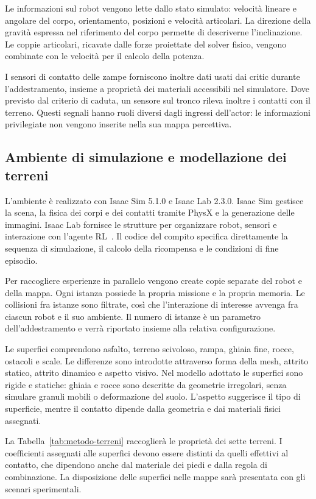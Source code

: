 Le informazioni sul robot vengono lette dallo stato simulato: velocità lineare e angolare del corpo, orientamento, posizioni e velocità articolari. La direzione della gravità espressa nel riferimento del corpo permette di descriverne l'inclinazione. Le coppie articolari, ricavate dalle forze proiettate del solver fisico, vengono combinate con le velocità per il calcolo della potenza.

I sensori di contatto delle zampe forniscono inoltre dati usati dai critic durante l'addestramento, insieme a proprietà dei materiali accessibili nel simulatore. Dove previsto dal criterio di caduta, un sensore sul tronco rileva inoltre i contatti con il terreno. Questi segnali hanno ruoli diversi dagli ingressi dell'actor: le informazioni privilegiate non vengono inserite nella sua mappa percettiva.

\subsection{Ambiente di simulazione e modellazione dei terreni}

L'ambiente è realizzato con Isaac Sim 5.1.0 e Isaac Lab 2.3.0. Isaac Sim gestisce la scena, la fisica dei corpi e dei contatti tramite PhysX e la generazione delle immagini. Isaac Lab fornisce le strutture per organizzare robot, sensori e interazione con l'agente RL~\citep{Mittal2025IsaacLab}. Il codice del compito specifica direttamente la sequenza di simulazione, il calcolo della ricompensa e le condizioni di fine episodio.

Per raccogliere esperienze in parallelo vengono create copie separate del robot e della mappa. Ogni istanza possiede la propria missione e la propria memoria. Le collisioni fra istanze sono filtrate, così che l'interazione di interesse avvenga fra ciascun robot e il suo ambiente. Il numero di istanze è un parametro dell'addestramento e verrà riportato insieme alla relativa configurazione.

Le superfici comprendono asfalto, terreno scivoloso, rampa, ghiaia fine, rocce, ostacoli e scale. Le differenze sono introdotte attraverso forma della mesh, attrito statico, attrito dinamico e aspetto visivo. Nel modello adottato le superfici sono rigide e statiche: ghiaia e rocce sono descritte da geometrie irregolari, senza simulare granuli mobili o deformazione del suolo. L'aspetto suggerisce il tipo di superficie, mentre il contatto dipende dalla geometria e dai materiali fisici assegnati.

La Tabella~\ref{tab:metodo-terreni} raccoglierà le proprietà dei sette terreni. I coefficienti assegnati alle superfici devono essere distinti da quelli effettivi al contatto, che dipendono anche dal materiale dei piedi e dalla regola di combinazione. La disposizione delle superfici nelle mappe sarà presentata con gli scenari sperimentali.

